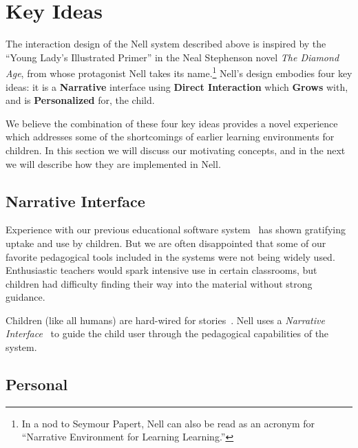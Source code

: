 \documentclass{acm_proc_article-sp}
\begin{document}
\section{Key Ideas}
The interaction design of the Nell system described above is inspired
by the ``Young Lady's Illustrated Primer'' in the Neal Stephenson
novel \textit{The Diamond Age}, from whose protagonist Nell takes its
name.\footnote{In a nod to Seymour Papert, Nell can also be read as an
acronym for ``Narrative Environment for Learning Learning.''}
Nell's design embodies four key ideas: it is a \textbf{Narrative}
interface using \textbf{Direct Interaction} which \textbf{Grows} with,
and is \textbf{Personalized} for, the child.

We believe the combination of these four key ideas provides a novel
experience which addresses some of the shortcomings of earlier
learning environments for children.  In this section we will discuss
our motivating concepts, and in the next we will describe how
they are implemented in Nell.


\subsection{Narrative Interface}

Experience with our previous educational software
system~\cite{flores:uruguay,idb:peru} has shown gratifying uptake and
use by children.  But we are often disappointed that some of our
favorite pedagogical tools included in the systems were not being
widely used.  Enthusiastic teachers would spark intensive use in
certain classrooms, but children had difficulty finding their way into
the material without strong guidance.

Children (like all humans) are hard-wired for
stories~\cite{boyd:stories}.  Nell uses a
\textit{Narrative Interface}~\cite{bizzocchi:narrative,don:narrative,laurel:computers} 
to guide the child user through the pedagogical capabilities of the system.

\subsection{Personal}
\end{document}
